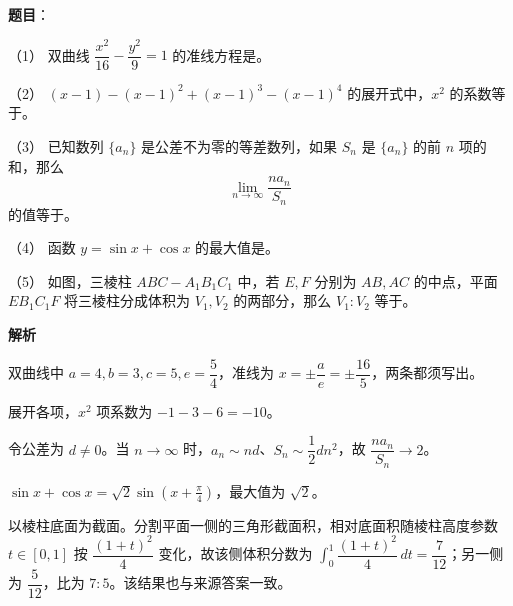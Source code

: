 \begin{answer}

\textbf{题目}：

（1） 双曲线 $\dfrac{x^2}{16}-\dfrac{y^2}{9}=1$ 的准线方程是\gkblank{}。

（2） $(x-1)-(x-1)^2+(x-1)^3-(x-1)^4$ 的展开式中，$x^2$ 的系数等于\gkblank{}。

（3） 已知数列 $\{a_n\}$ 是公差不为零的等差数列，如果 $S_n$ 是 $\{a_n\}$ 的前 $n$ 项的和，那么
\nopagebreak[4]
\[
\lim_{n\to\infty}\frac{na_n}{S_n}
\]
的值等于\gkblank{}。

（4） 函数 $y=\sin x+\cos x$ 的最大值是\gkblank{}。

（5） 如图，三棱柱 $ABC-A_1B_1C_1$ 中，若 $E,F$ 分别为 $AB,AC$ 的中点，平面 $EB_1C_1F$ 将三棱柱分成体积为 $V_1,V_2$ 的两部分，那么 $V_1:V_2$ 等于\gkblank{}。
\nopagebreak[4]
\begin{center}\end{center}
\nopagebreak[4]

\textbf{解析}


双曲线中 $a=4,b=3,c=5,e=\dfrac54$，准线为 $x=\pm\dfrac ae=\pm\dfrac{16}{5}$，两条都须写出。


展开各项，$x^2$ 项系数为 $-1-3-6=-10$。


令公差为 $d\ne0$。当 $n\to\infty$ 时，$a_n\sim nd$、$S_n\sim\dfrac12dn^2$，故 $\dfrac{na_n}{S_n}\to2$。


$\sin x+\cos x=\sqrt2\sin(x+\frac\pi4)$，最大值为 $\sqrt2$。


以棱柱底面为截面。分割平面一侧的三角形截面积，相对底面积随棱柱高度参数 $t\in[0,1]$ 按 $\dfrac{(1+t)^2}{4}$ 变化，故该侧体积分数为 $\int_0^1\dfrac{(1+t)^2}{4}\,dt=\dfrac7{12}$；另一侧为 $\dfrac5{12}$，比为 $7:5$。该结果也与来源答案一致。






\end{answer}
